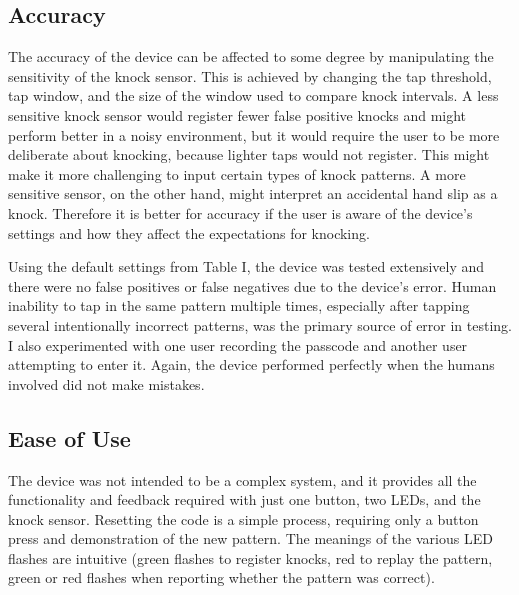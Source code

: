 \documentclass[conference]{./IEEEtran}
\begin{document}
\subsection{Accuracy}
The accuracy of the device can be affected to some degree by manipulating the sensitivity of the knock sensor. This is achieved by changing the tap threshold, tap window, and the size of the window used to compare knock intervals. A less sensitive knock sensor would register fewer false positive knocks and might perform better in a noisy environment, but it would require the user to be more deliberate about knocking, because lighter taps would not register. This might make it more challenging to input certain types of knock patterns. A more sensitive sensor, on the other hand, might interpret an accidental hand slip as a knock. Therefore it is better for accuracy if the user is aware of the device's settings and how they affect the expectations for knocking. 

Using the default settings from Table I, the device was tested extensively and there were no false positives or false negatives due to the device's error. Human inability to tap in the same pattern multiple times, especially after tapping several intentionally incorrect patterns, was the primary source of error in testing. I also experimented with one user recording the passcode and another user attempting to enter it. Again, the device performed perfectly when the humans involved did not make mistakes. 

\subsection{Ease of Use}
The device was not intended to be a complex system, and it provides all the functionality and feedback required with just one button, two LEDs, and the knock sensor. Resetting the code is a simple process, requiring only a button press and demonstration of the new pattern. The meanings of the various LED flashes are intuitive (green flashes to register knocks, red to replay the pattern, green or red flashes when reporting whether the pattern was correct). 
\end{document}
